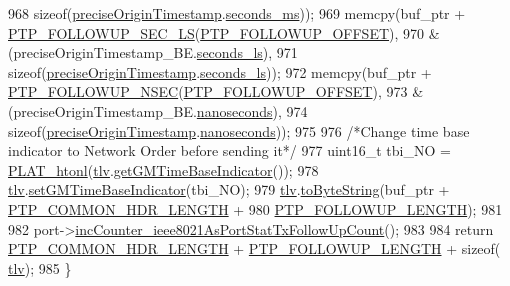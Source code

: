 \begin{DoxyCode}
968         \textcolor{keyword}{sizeof}(\hyperlink{class_p_t_p_message_follow_up_ab410646215c0bcbaf124d5923f22e2ca}{preciseOriginTimestamp}.\hyperlink{class_timestamp_a5d98378d782519e6f9c17db70f1620f0}{seconds\_ms}));
969     memcpy(buf\_ptr + \hyperlink{avbts__message_8hpp_a470982eacf33272b811d30ffc5643355}{PTP\_FOLLOWUP\_SEC\_LS}(\hyperlink{avbts__message_8hpp_af54dd338e8c2b906b028746fbecdb74d}{PTP\_FOLLOWUP\_OFFSET}),
970         &(preciseOriginTimestamp\_BE.\hyperlink{class_timestamp_a2bf200e58cd268d8b86cf93c51500a44}{seconds\_ls}),
971         \textcolor{keyword}{sizeof}(\hyperlink{class_p_t_p_message_follow_up_ab410646215c0bcbaf124d5923f22e2ca}{preciseOriginTimestamp}.\hyperlink{class_timestamp_a2bf200e58cd268d8b86cf93c51500a44}{seconds\_ls}));
972     memcpy(buf\_ptr + \hyperlink{avbts__message_8hpp_a0cc3e393e41f74bf9befbca3c62cbcdb}{PTP\_FOLLOWUP\_NSEC}(\hyperlink{avbts__message_8hpp_af54dd338e8c2b906b028746fbecdb74d}{PTP\_FOLLOWUP\_OFFSET}),
973         &(preciseOriginTimestamp\_BE.\hyperlink{class_timestamp_a78ae11d98fcfe738239d0a853d82c84a}{nanoseconds}),
974         \textcolor{keyword}{sizeof}(\hyperlink{class_p_t_p_message_follow_up_ab410646215c0bcbaf124d5923f22e2ca}{preciseOriginTimestamp}.\hyperlink{class_timestamp_a78ae11d98fcfe738239d0a853d82c84a}{nanoseconds}));
975 
976     \textcolor{comment}{/*Change time base indicator to Network Order before sending it*/}
977     uint16\_t tbi\_NO = \hyperlink{linux_2src_2platform_8cpp_a8bf9e45ac3e41441f0e139139241c19d}{PLAT\_htonl}(\hyperlink{class_p_t_p_message_follow_up_adb3aa00a5c7072f30af7374ea54c158c}{tlv}.\hyperlink{class_follow_up_t_l_v_ad7a016b1865179daf06f37ae3b16a074}{getGMTimeBaseIndicator}());
978     \hyperlink{class_p_t_p_message_follow_up_adb3aa00a5c7072f30af7374ea54c158c}{tlv}.\hyperlink{class_follow_up_t_l_v_a4d1293d955327fa9bf8fffc61b6d990c}{setGMTimeBaseIndicator}(tbi\_NO);
979     \hyperlink{class_p_t_p_message_follow_up_adb3aa00a5c7072f30af7374ea54c158c}{tlv}.\hyperlink{class_follow_up_t_l_v_acd2477c3b4df4f055d57ceae73e545a0}{toByteString}(buf\_ptr + \hyperlink{avbts__message_8hpp_a8ec4d965b7b1e83844f1c17f12e9b8e4}{PTP\_COMMON\_HDR\_LENGTH} +
980              \hyperlink{avbts__message_8hpp_a7db8f880133691145b633e681fea9d27}{PTP\_FOLLOWUP\_LENGTH});
981 
982     port->\hyperlink{class_common_port_ae5cfa5848fcdcb7c50e2ffaecee3bf24}{incCounter\_ieee8021AsPortStatTxFollowUpCount}();
983 
984     \textcolor{keywordflow}{return} \hyperlink{avbts__message_8hpp_a8ec4d965b7b1e83844f1c17f12e9b8e4}{PTP\_COMMON\_HDR\_LENGTH} + \hyperlink{avbts__message_8hpp_a7db8f880133691145b633e681fea9d27}{PTP\_FOLLOWUP\_LENGTH} + \textcolor{keyword}{sizeof}(
      \hyperlink{class_p_t_p_message_follow_up_adb3aa00a5c7072f30af7374ea54c158c}{tlv});
985 \}
\end{DoxyCode}


